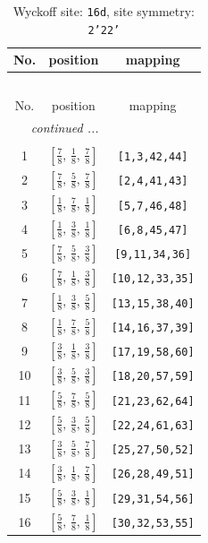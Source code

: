 \documentclass[fleqn,8pt]{jsarticle}
\begin{document}
\renewcommand{\arraystretch}{1.2}
\begin{longtable}{ccc}
\caption{Wyckoff site: {\tt 16d}, site symmetry: {\tt 2'22'}}
 \\
 \hline \hline
No. & position & mapping \\ \hline \endfirsthead

\multicolumn{2}{l}{\tablename\ \thetable{}} \\
 \hline \hline
No. & position & mapping \\ \hline \endhead

 \hline \hline
\multicolumn{2}{r}{\footnotesize\it continued ...} \\ \endfoot

 \hline \hline
\multicolumn{2}{r}{} \\ \endlastfoot

1 & $\left[ \frac{7}{8},\, \frac{1}{8},\, \frac{7}{8} \right]$ & {\tt [1,3,42,44]} \\ \hline
2 & $\left[ \frac{7}{8},\, \frac{5}{8},\, \frac{7}{8} \right]$ & {\tt [2,4,41,43]} \\ \hline
3 & $\left[ \frac{1}{8},\, \frac{7}{8},\, \frac{1}{8} \right]$ & {\tt [5,7,46,48]} \\ \hline
4 & $\left[ \frac{1}{8},\, \frac{3}{8},\, \frac{1}{8} \right]$ & {\tt [6,8,45,47]} \\ \hline
5 & $\left[ \frac{7}{8},\, \frac{5}{8},\, \frac{3}{8} \right]$ & {\tt [9,11,34,36]} \\ \hline
6 & $\left[ \frac{7}{8},\, \frac{1}{8},\, \frac{3}{8} \right]$ & {\tt [10,12,33,35]} \\ \hline
7 & $\left[ \frac{1}{8},\, \frac{3}{8},\, \frac{5}{8} \right]$ & {\tt [13,15,38,40]} \\ \hline
8 & $\left[ \frac{1}{8},\, \frac{7}{8},\, \frac{5}{8} \right]$ & {\tt [14,16,37,39]} \\ \hline
9 & $\left[ \frac{3}{8},\, \frac{1}{8},\, \frac{3}{8} \right]$ & {\tt [17,19,58,60]} \\ \hline
10 & $\left[ \frac{3}{8},\, \frac{5}{8},\, \frac{3}{8} \right]$ & {\tt [18,20,57,59]} \\ \hline
11 & $\left[ \frac{5}{8},\, \frac{7}{8},\, \frac{5}{8} \right]$ & {\tt [21,23,62,64]} \\ \hline
12 & $\left[ \frac{5}{8},\, \frac{3}{8},\, \frac{5}{8} \right]$ & {\tt [22,24,61,63]} \\ \hline
13 & $\left[ \frac{3}{8},\, \frac{5}{8},\, \frac{7}{8} \right]$ & {\tt [25,27,50,52]} \\ \hline
14 & $\left[ \frac{3}{8},\, \frac{1}{8},\, \frac{7}{8} \right]$ & {\tt [26,28,49,51]} \\ \hline
15 & $\left[ \frac{5}{8},\, \frac{3}{8},\, \frac{1}{8} \right]$ & {\tt [29,31,54,56]} \\ \hline
16 & $\left[ \frac{5}{8},\, \frac{7}{8},\, \frac{1}{8} \right]$ & {\tt [30,32,53,55]} \\
\end{longtable}
\end{document}
